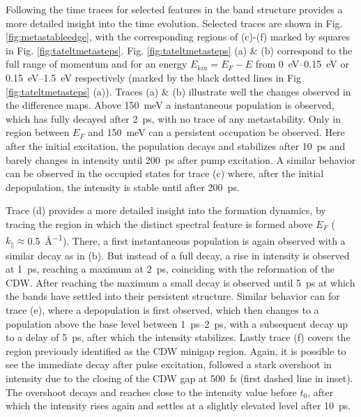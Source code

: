 Following the time traces for selected features in the band structure provides a more detailed insight into the time evolution.
Selected traces are shown in Fig. \ref{fig:metastableedge}, with the corresponding regions of (c)-(f) marked by squares in Fig. \ref{fig:tateltmetasteps}.
Fig. \ref{fig:tateltmetasteps} (a) \& (b) correspond to the full range of momentum and for an energy $E_{kin}=E_F-E$ from \qtyrange{0}{0.15}{\electronvolt} or \qtyrange{0.15}{1.5}{\electronvolt} respectively (marked by the black dotted lines in Fig \ref{fig:tateltmetasteps} (a)).
Traces (a) \& (b) illustrate well the changes observed in the difference maps.
Above \qty{150}{\milli\electronvolt} a instantaneous population is observed, which has fully decayed after \qty{2}{\pico\second}, with no trace of any metastability.
Only in region between $E_F$ and \qty{150}{\milli\electronvolt} can a persistent occupation be observed.
Here after the initial excitation, the population decays and stabilizes after \qty{10}{\pico\second} and barely changes in intensity until \qty{200}{\pico\second} after pump excitation.
A similar behavior can be observed in the occupied states for trace (c) where, after the initial depopulation, the intensity is stable until after \qty{200}{\pico\second}.

Trace (d) provides a more detailed insight into the formation dynamics, by tracing the region in which the distinct spectral feature is formed above $E_F$ ($k_\parallel\approx$\qty{0.5}{\angstrom^{-1}}).
There, a first instantaneous population is again observed with a similar decay as in (b).
But instead of a full decay, a rise in intensity is observed at \qty{1}{\pico\second}, reaching a maximum at \qty{2}{\pico\second}, coinciding with the reformation of the CDW.
After reaching the maximum a small decay is observed until \qty{5}{\pico\second} at which the bands have settled into their persistent structure.
Similar behavior can for trace (e), where a depopulation is first observed, which then changes to a population above the base level between \qtyrange{1}{2}{\pico\second}, with a subsequent decay up to a delay of \qty{5}{\pico\second}, after which the intensity stabilizes.
Lastly trace (f) covers the region previously identified as the CDW minigap region.
Again, it is possible to see the immediate decay after pulse excitation, followed a stark overshoot in intensity due to the closing of the CDW gap at \qty{500}{\femto\second} (first dashed line in inset).
The overshoot decays and reaches close to the intensity value before $t_0$, after which the intensity rises again and settles at a slightly elevated level after \qty{10}{\pico\second}.

